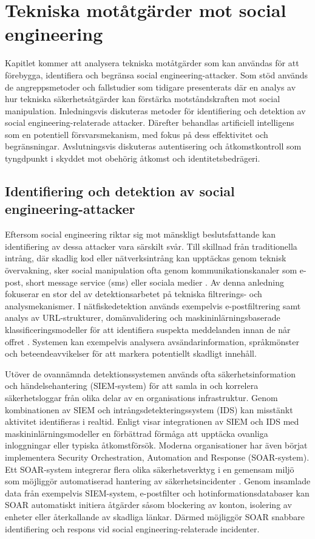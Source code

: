 \chapter{Tekniska motåtgärder mot social engineering}
Kapitlet kommer att analysera tekniska motåtgärder som kan användas för att förebygga, identifiera och begränsa social engineering-attacker. 
Som stöd används de angreppsmetoder och fallstudier som tidigare presenterats där en analys av hur tekniska säkerhetsåtgärder kan förstärka motståndskraften mot 
social manipulation. Inledningsvis diskuteras metoder för identifiering och detektion av social engineering-relaterade attacker. Därefter behandlas artificiell 
intelligens som en potentiell försvarsmekanism, med fokus på dess effektivitet och begränsningar. Avslutningsvis diskuteras autentisering och åtkomstkontroll som 
tyngdpunkt i skyddet mot obehörig åtkomst och identitetsbedrägeri.

\section{Identifiering och detektion av social engineering-attacker}
Eftersom social engineering riktar sig mot mänskligt beslutsfattande kan identifiering av dessa attacker vara särskilt svår. Till skillnad från traditionella intrång, 
där skadlig kod eller nätverksintrång kan upptäckas genom teknisk övervakning, sker social manipulation ofta genom kommunikationskanaler som e-post, 
short message service (sms) eller sociala medier \cite{se_threat_defense_survey, algarni2019se_survey}. Av denna anledning fokuserar en stor del av detektionsarbetet 
på tekniska filtrerings- och analysmekanismer. I nätfiskedetektion används exempelvis e-postfiltrering samt analys av URL-strukturer, domänvalidering och 
maskininlärningsbaserade klassificeringsmodeller för att identifiera suspekta meddelanden innan de når offret \cite{basnet2023anti_phishing}. Systemen kan exempelvis 
analysera avsändarinformation, språkmönster och beteendeavvikelser för att markera potentiellt skadligt innehåll.

Utöver de ovannämnda detektionssystemen används ofta säkerhetsinformation och händelsehantering (SIEM-system) för att samla in och korrelera säkerhetsloggar från olika 
delar av en organisations infrastruktur. Genom kombinationen av SIEM och intrångsdetekteringssystem (IDS) kan misstänkt aktivitet identifieras i realtid. 
Enligt \cite{siem_comprehensive_study_2022} visar integrationen av SIEM och IDS med maskininlärningsmodeller en förbättrad förmåga att upptäcka ovanliga inloggningar 
eller typiska åtkomstförsök. Moderna organisationer har även börjat implementera Security Orchestration, Automation and Response (SOAR-system). Ett SOAR-system integrerar 
flera olika säkerhetsverktyg i en gemensam miljö som möjliggör automatiserad hantering av säkerhetsincidenter \cite{almohri2024soar}. Genom insamlade data från exempelvis 
SIEM-system, e-postfilter och hotinformationsdatabaser kan SOAR automatiskt initiera åtgärder såsom blockering av konton, isolering av enheter eller återkallande av 
skadliga länkar. Därmed möjliggör SOAR snabbare identifiering och respons vid social engineering-relaterade incidenter.

